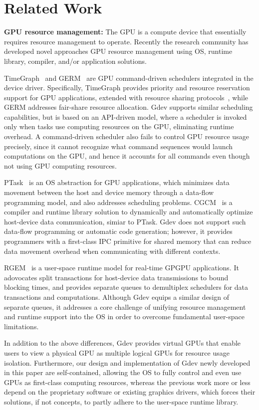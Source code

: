 \section{Related Work}
\label{related_work}

\textbf{GPU resource management:}
The GPU is a compute device that essentially requires resource management
to operate.
Recently the research community has developed novel approaches GPU
resource management using OS, runtime library, compiler, and/or
application solutions.

TimeGraph~\cite{Kato_ATC11} and GERM~\cite{Bautin_MCNC08} are GPU
command-driven schedulers integrated in the device driver.
Specifically, TimeGraph provides priority and resource reservation
support for GPU applications, extended with resource sharing
protocols~\cite{Kato_RTAS11}, while GERM addresses fair-share
resource allocation. 
Gdev supports similar scheduling capabilities, but is based on an
API-driven model, where a scheduler is invoked only when tasks use
computing resources on the GPU, eliminating runtime overhead.
A command-driven scheduler also fails to control GPU resource usage
precisely, since it cannot recognize what command sequences would launch
computations on the GPU, and hence it accounts for all commands even
though not using GPU computing resources.

PTask~\cite{Rossbach_SOSP11} is an OS abstraction for GPU applications,
which minimizes data movement between the host and device memory through
a data-flow programming model, and also addresses scheduling problems.
CGCM~\cite{Jablin_PLDI11} is a compiler and runtime library solution to
dynamically and automatically optimize host-device data communication,
simiar to PTask.
Gdev does not support such data-flow programming or automatic code
generation; however, it provides programmers with a first-class IPC
primitive for shared memory that can reduce data movement overhead when
communicating with different contexts.

RGEM~\cite{Kato_RTSS11} is a user-space runtime model for real-time
GPGPU applications.
It adovocates split transactions for host-device data transmissions
to bound blocking times, and provides separate queues to demultiplex
schedulers for data transactions and computations.
Although Gdev equips a similar design of separate queues, it
addresses a core challenge of unifying resource management
and runtime support into the OS in order to overcome fundamental
user-space limitations.

In addition to the above differences, Gdev provides virtual GPUs that
enable users to view a physical GPU as multiple logical GPUs for
resource usage isolation.
Furthermore, our design and implementation of Gdev newly developed in
this paper are self-contained, allowing the OS to fully control and even
use GPUs as first-class computing resources, whereas the previous work
more or less depend on the proprietary software or existing graphics
drivers, which forces their solutions, if not concepts, to partly adhere
to the user-space runtime library.

